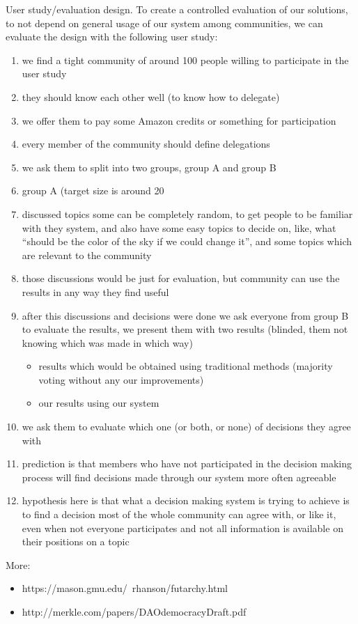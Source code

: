 \documentclass{sigchi}
\begin{document}
User study/evaluation design.
To create a controlled evaluation of our solutions, to not depend on general usage of our system among communities,
we can evaluate the design with the following user study:
\begin{enumerate}
\item we find a tight community of around 100 people willing to participate in the user study
\item they should know each other well (to know how to delegate)
\item we offer them to pay some Amazon credits or something for participation
\item every member of the community should define delegations
\item we ask them to split into two groups, group A and group B
\item group A (target size is around 20%
\item discussed topics some can be completely random, to get people to be familiar with they system, and also have some
easy topics to decide on, like, what ``should be the color of the sky if we could change it'', and some topics which are relevant to the community
\item those discussions would be just for evaluation, but community can use the results in any way they find useful
\item after this discussions and decisions were done we ask everyone from group B to evaluate the results, we present them with two results (blinded, them not knowing which was made in which way)
\begin{itemize}
\item results which would be obtained using traditional methods (majority voting without any our improvements)
\item our results using our system
\end{itemize}
\item we ask them to evaluate which one (or both, or none) of decisions they agree with
\item prediction is that members who have not participated in the decision making process will
find decisions made through our system more often agreeable
\item hypothesis here is that what a decision making system is trying to achieve is to find a decision most of the
whole community can agree with, or like it, even when not everyone participates and not all information is available
on their positions on a topic
\end{enumerate}




More:
\begin{itemize}
\item https://mason.gmu.edu/~rhanson/futarchy.html
\item http://merkle.com/papers/DAOdemocracyDraft.pdf
\end{itemize}
\end{document}
